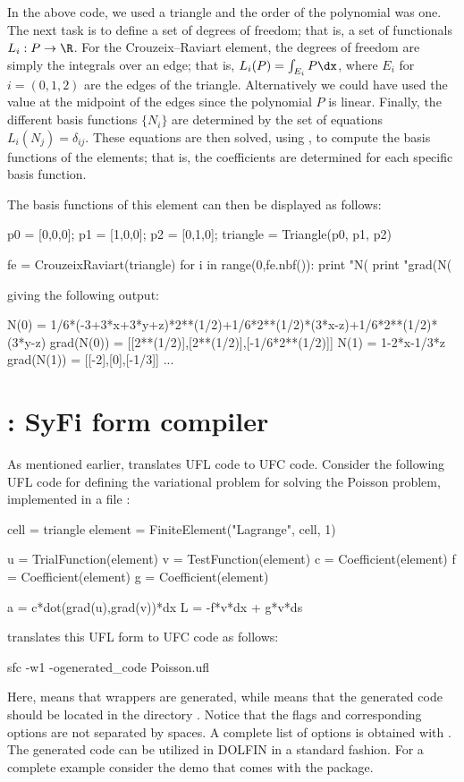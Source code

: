 In the above code, we used a triangle and the order of the polynomial
was one. The next task is to define a set of degrees of freedom; that is,
a set of functionals $L_i : P \rightarrow \R$.  For the Crouzeix--Raviart
element, the degrees of freedom are simply the integrals over an edge;
that is, $L_i(P) = \int_{E_i} P \dx$, where $E_i$ for $i=(0,1,2)$ are the
edges of the triangle. Alternatively we could have used the value at
the midpoint of the edges since the polynomial $P$ is linear.  Finally,
the different basis functions $\{N_i\}$ are determined by the set of
equations $L_i(N_j) = \delta_{ij}$.  These equations are then solved,
using , to compute the basis functions of the elements;
that is, the coefficients \emp{[a0\_0, a0\_1, a0\_2]} are determined for
each specific basis function.

The basis functions of this element can then be displayed as follows:
\begin{python}
p0 = [0,0,0]; p1 = [1,0,0]; p2 = [0,1,0];
triangle = Triangle(p0, p1, p2)

fe = CrouzeixRaviart(triangle)
for i in range(0,fe.nbf()):
  print "N(%
  print "grad(N(%
\end{python}
giving the following output:
\begin{c++}
N(0)       =  1/6*(-3+3*x+3*y+z)*2**(1/2)+1/6*2**(1/2)*(3*x-z)+1/6*2**(1/2)*(3*y-z)
grad(N(0)) =  [[2**(1/2)],[2**(1/2)],[-1/6*2**(1/2)]]
N(1)       =  1-2*x-1/3*z
grad(N(1)) =  [[-2],[0],[-1/3]]
...
\end{c++}

\section{\sfc{}: SyFi form compiler}

As mentioned earlier, \sfc{} translates UFL code to UFC code. Consider the
following UFL code for defining the variational problem for solving the
Poisson problem, implemented in a file :
\begin{python}
cell = triangle
element = FiniteElement("Lagrange", cell, 1)

u = TrialFunction(element)
v = TestFunction(element)
c = Coefficient(element)
f = Coefficient(element)
g = Coefficient(element)

a = c*dot(grad(u),grad(v))*dx
L = -f*v*dx + g*v*ds
\end{python}
\sfc{} translates this UFL form to UFC code as follows:
\begin{bash}
sfc -w1  -ogenerated_code Poisson.ufl
\end{bash}
Here,  means that \dolfin{} wrappers are generated, while
 means that the generated code should be
located in the directory . Notice that the flags
and corresponding options are not separated by spaces. A complete
list of options is obtained with .  The generated code can be
utilized in DOLFIN in a standard fashion.  For a complete example consider
the demo  that comes with the \syfi{} package.

